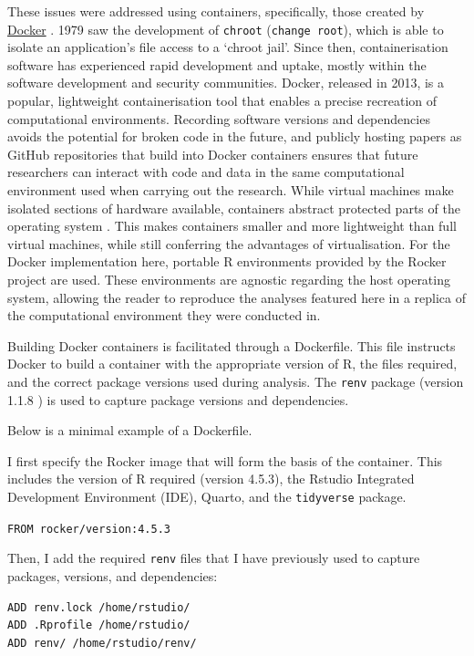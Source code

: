 \documentclass[../main.tex]{subfiles}
\begin{document}
These issues were addressed using containers, specifically, those
created by \href{https://www.docker.com/}{Docker}
\cite{merkel_2014, boettiger_2015}. 1979 saw the development of
\texttt{chroot} (\texttt{change\ root}), which is able to isolate an
application's file access to a `chroot jail'. Since then,
containerisation software has experienced rapid development and uptake,
mostly within the software development and security communities. Docker,
released in 2013, is a popular, lightweight containerisation tool that
enables a precise recreation of computational environments. Recording
software versions and dependencies avoids the potential for broken code
in the future, and publicly hosting papers as GitHub repositories that
build into Docker containers ensures that future researchers can
interact with code and data in the same computational environment used
when carrying out the research. While virtual machines make isolated
sections of hardware available, containers abstract protected parts of
the operating system \cite{merkel_2014}. This makes containers smaller
and more lightweight than full virtual machines, while still conferring
the advantages of virtualisation. For the Docker implementation here,
portable R environments provided by the Rocker project
\cite{boettiger_2017} are used. These environments are agnostic
regarding the host operating system, allowing the reader to reproduce
the analyses featured here in a replica of the computational environment
they were conducted in.

Building Docker containers is facilitated through a Dockerfile. This
file instructs Docker to build a container with the appropriate version
of R, the files required, and the correct package versions used during
analysis. The \texttt{renv} package (version 1.1.8 \cite{renv}) is used
to capture package versions and dependencies.

Below is a minimal example of a Dockerfile.

I first specify the Rocker image that will form the basis of the
container. This includes the version of R required (version 4.5.3), the
Rstudio Integrated Development Environment (IDE), Quarto, and the
\texttt{tidyverse} package.

\texttt{FROM\ rocker/version:4.5.3}

Then, I add the required \texttt{renv} files that I have previously used
to capture packages, versions, and dependencies:

\begin{verbatim}
ADD renv.lock /home/rstudio/
ADD .Rprofile /home/rstudio/
ADD renv/ /home/rstudio/renv/
\end{verbatim}
\end{document}
